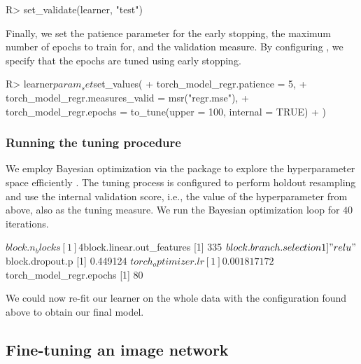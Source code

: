 \documentclass[article]{jss}
\theoremstyle{definition}
\begin{document}
\begin{CodeInput}
R> set_validate(learner, "test")
\end{CodeInput}

Finally, we set the patience parameter for the early stopping, the maximum number of epochs to train for, and the validation measure.
By configuring , we specify that the epochs are tuned using early stopping.

\begin{CodeInput}
R> learner$param_set$set_values(
+    torch_model_regr.patience = 5,
+    torch_model_regr.measures_valid = msr("regr.mse"),
+    torch_model_regr.epochs = to_tune(upper = 100, internal = TRUE)
+  )
\end{CodeInput}

\subsubsection{Running the tuning procedure}

We employ Bayesian optimization via the  package to explore the hyperparameter space efficiently \citep{ref-mlr3mbo}.
The tuning process is configured to perform holdout resampling and use the internal validation score, i.e., the value of the  hyperparameter from above, also as the tuning measure.
We run the Bayesian optimization loop for $40$ iterations.

\begin{CodeOutput}
$block.n_blocks
[1] 4
$block.linear.out_features
[1] 335
$block.branch.selection
1] "relu"
$block.dropout.p
[1] 0.449124
$torch_optimizer.lr
[1] 0.001817172
$torch_model_regr.epochs
[1] 80
\end{CodeOutput}

We could now re-fit our learner on the whole data with the configuration found above to obtain our final model.

\subsection{Fine-tuning an image network}\label{sec:finetuning}
\end{document}
